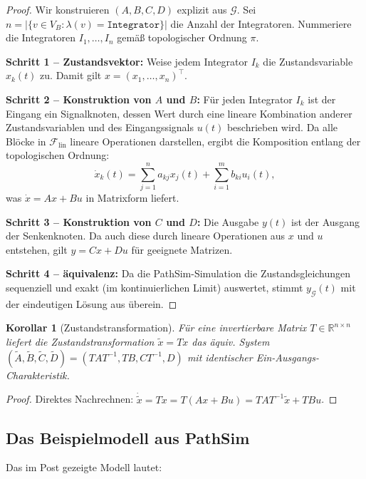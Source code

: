 ﻿\documentclass[12pt,a4paper]{article}
\newtheorem{korollar}[theorem]{Korollar}
\theoremstyle{definition}
\begin{document}
\begin{proof}
Wir konstruieren $(A, B, C, D)$ explizit aus $\mathcal{G}$. Sei
$n = |\{v \in V_B : \lambda(v) = \texttt{Integrator}\}|$ die Anzahl der
Integratoren. Nummeriere die Integratoren $I_1, \ldots, I_n$ gemä\ss{}
topologischer Ordnung $\pi$.

\textbf{Schritt 1 -- Zustandsvektor:} Weise jedem Integrator $I_k$ die
Zustandsvariable $x_k(t)$ zu. Damit gilt $x = (x_1, \ldots, x_n)^\top$.

\textbf{Schritt 2 -- Konstruktion von $A$ und $B$:} Für jeden Integrator $I_k$
ist der Eingang ein Signalknoten, dessen Wert durch eine lineare Kombination
anderer Zustandsvariablen und des Eingangssignals $u(t)$ beschrieben wird.
Da alle Blöcke in $\mathcal{F}_{\mathrm{lin}}$ lineare Operationen darstellen,
ergibt die Komposition entlang der topologischen Ordnung:
\[
  \dot{x}_k(t) = \sum_{j=1}^n a_{kj} x_j(t) + \sum_{i=1}^m b_{ki} u_i(t),
\]
was $\dot{x} = Ax + Bu$ in Matrixform liefert.

\textbf{Schritt 3 -- Konstruktion von $C$ und $D$:} Die Ausgabe $y(t)$ ist
der Ausgang der Senkenknoten. Da auch diese durch lineare Operationen aus
$x$ und $u$ entstehen, gilt $y = Cx + Du$ für geeignete Matrizen.

\textbf{Schritt 4 -- äquivalenz:} Da die PathSim-Simulation die Zustandsgleichungen
sequenziell und exakt (im kontinuierlichen Limit) auswertet, stimmt
$y_{\mathcal{G}}(t)$ mit der eindeutigen Lösung aus  überein.
\end{proof}

\begin{korollar}[Zustandstransformation]
\label{kor:transform}
Für eine invertierbare Matrix $T \in \mathbb{R}^{n \times n}$ liefert die
Zustandstransformation $\tilde{x} = Tx$ das äquiv. System
$(\tilde{A}, \tilde{B}, \tilde{C}, \tilde{D}) = (TAT^{-1}, TB, CT^{-1}, D)$
mit identischer Ein-Ausgangs-Charakteristik.
\end{korollar}

\begin{proof}
Direktes Nachrechnen: $\dot{\tilde{x}} = T\dot{x} = T(Ax + Bu) = TAT^{-1}\tilde{x} + TBu$.
\end{proof}

\subsection{Das Beispielmodell aus PathSim}

Das im Post gezeigte Modell lautet:
\end{document}
